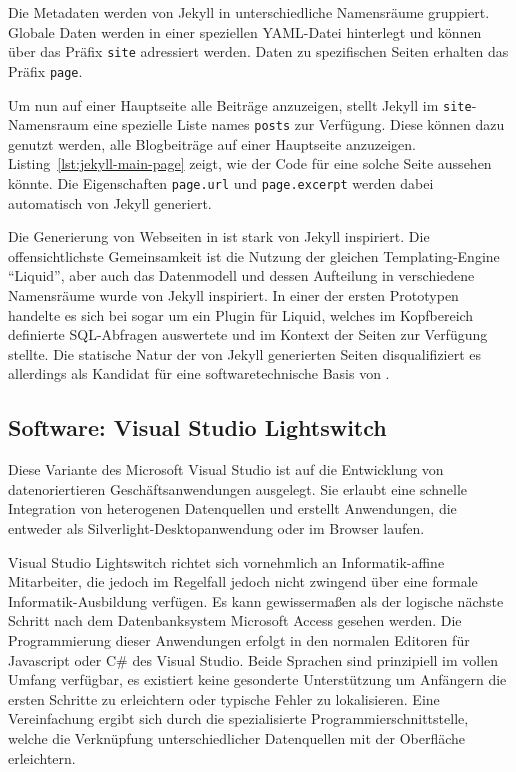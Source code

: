 Die Metadaten werden von Jekyll in unterschiedliche Namensräume gruppiert. Globale Daten werden in einer speziellen YAML-Datei hinterlegt und können über das Präfix \texttt{site} adressiert werden. Daten zu spezifischen Seiten erhalten das Präfix \texttt{page}.

Um nun auf einer Hauptseite alle Beiträge anzuzeigen, stellt Jekyll im \texttt{site}-Namensraum eine spezielle Liste names \texttt{posts} zur Verfügung. Diese können dazu genutzt werden, alle Blogbeiträge auf einer Hauptseite anzuzeigen. Listing~\ref{lst:jekyll-main-page} zeigt, wie der Code für eine solche Seite aussehen könnte. Die Eigenschaften \texttt{page.url} und \texttt{page.excerpt} werden dabei automatisch von Jekyll generiert.

Die Generierung von Webseiten in \idename{} ist stark von Jekyll inspiriert. Die offensichtlichste Gemeinsamkeit ist die Nutzung der gleichen Templating-Engine "`Liquid"', aber auch das Datenmodell und dessen Aufteilung in verschiedene Namensräume wurde von Jekyll inspiriert. In einer der ersten Prototypen handelte es sich bei \idename{} sogar um ein Plugin für Liquid, welches im Kopfbereich definierte SQL-Abfragen auswertete und im Kontext der Seiten zur Verfügung stellte. Die statische Natur der von Jekyll generierten Seiten disqualifiziert es allerdings als Kandidat für eine softwaretechnische Basis von \idename{}.

\subsection{Software: Visual Studio Lightswitch}

Diese Variante des Microsoft Visual Studio ist auf die Entwicklung von datenoriertieren Geschäftsanwendungen ausgelegt. Sie erlaubt eine schnelle Integration von heterogenen Datenquellen und erstellt Anwendungen, die entweder als Silverlight-Desktopanwendung oder im Browser laufen.

Visual Studio Lightswitch richtet sich vornehmlich an Informatik-affine Mitarbeiter, die jedoch im Regelfall jedoch nicht zwingend über eine formale Informatik-Ausbildung verfügen. Es kann gewissermaßen als der logische nächste Schritt nach dem Datenbanksystem Microsoft Access gesehen werden. Die Programmierung dieser Anwendungen erfolgt in den normalen Editoren für Javascript oder C\# des Visual Studio. Beide Sprachen sind prinzipiell im vollen Umfang verfügbar, es existiert keine gesonderte Unterstützung um Anfängern die ersten Schritte zu erleichtern oder typische Fehler zu lokalisieren. Eine Vereinfachung ergibt sich durch die spezialisierte Programmierschnittstelle, welche die Verknüpfung unterschiedlicher Datenquellen mit der Oberfläche erleichtern.

